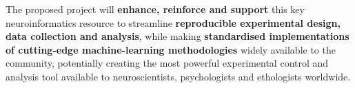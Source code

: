 The proposed project will \textbf{enhance, reinforce and support} this key neuroinformatics
resource to streamline \textbf{reproducible experimental design, data collection and analysis}, while making \textbf{standardised implementations of cutting-edge machine-learning methodologies} widely available to the community, potentially creating the most powerful experimental
control and analysis tool available to neuroscientists, psychologists and
ethologists worldwide.




%
%





